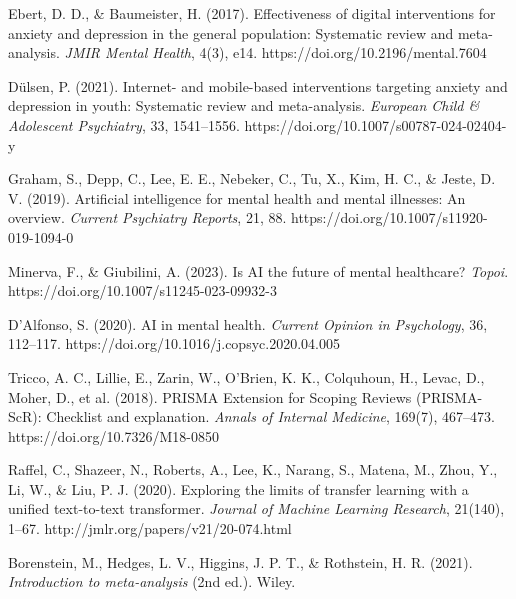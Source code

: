 \documentclass[sn-basic,authoryear]{sn-jnl}
\begin{document}
\begin{thebibliography}{99}
Ebert, D. D., \& Baumeister, H. (2017). Effectiveness of digital interventions for anxiety and depression in the general population: Systematic review and meta-analysis. \textit{JMIR Mental Health}, 4(3), e14. https://doi.org/10.2196/mental.7604

Dülsen, P. (2021). Internet- and mobile-based interventions targeting anxiety and depression in youth: Systematic review and meta-analysis. \textit{European Child \& Adolescent Psychiatry}, 33, 1541–1556. https://doi.org/10.1007/s00787-024-02404-y

Graham, S., Depp, C., Lee, E. E., Nebeker, C., Tu, X., Kim, H. C., \& Jeste, D. V. (2019). Artificial intelligence for mental health and mental illnesses: An overview. \textit{Current Psychiatry Reports}, 21, 88. https://doi.org/10.1007/s11920-019-1094-0

Minerva, F., \& Giubilini, A. (2023). Is AI the future of mental healthcare? \textit{Topoi}. https://doi.org/10.1007/s11245-023-09932-3

D'Alfonso, S. (2020). AI in mental health. \textit{Current Opinion in Psychology}, 36, 112–117. https://doi.org/10.1016/j.copsyc.2020.04.005

Tricco, A. C., Lillie, E., Zarin, W., O'Brien, K. K., Colquhoun, H., Levac, D., Moher, D., et al. (2018). PRISMA Extension for Scoping Reviews (PRISMA-ScR): Checklist and explanation. \textit{Annals of Internal Medicine}, 169(7), 467–473. https://doi.org/10.7326/M18-0850

Raffel, C., Shazeer, N., Roberts, A., Lee, K., Narang, S., Matena, M., Zhou, Y., Li, W., \& Liu, P. J. (2020). Exploring the limits of transfer learning with a unified text-to-text transformer. \textit{Journal of Machine Learning Research}, 21(140), 1–67. http://jmlr.org/papers/v21/20-074.html

Borenstein, M., Hedges, L. V., Higgins, J. P. T., \& Rothstein, H. R. (2021). \textit{Introduction to meta-analysis} (2nd ed.). Wiley. 

\end{thebibliography}
\end{document}
